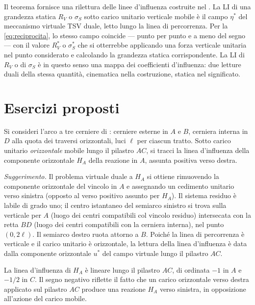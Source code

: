 \begin{oss}
	Il teorema fornisce una rilettura delle linee d'influenza 
	costruite nel . La LI di una 
	grandezza statica $R_V$ o $\sigma_S$ sotto carico unitario 
	verticale mobile è il campo $\eta^{*}$ del meccanismo virtuale 
	TSV duale, letto lungo la linea di percorrenza. Per la 
	\eqref{eq:reciprocita}, lo stesso campo coincide --- punto per 
	punto e a meno del segno --- con il valore $R^{*}_V$ o 
	$\sigma^{*}_S$ che si otterrebbe applicando una forza 
	verticale unitaria nel punto considerato e calcolando la 
	grandezza statica corrispondente. La LI di $R_V$ o di 
	$\sigma_S$ è in questo senso una mappa dei coefficienti 
	d'influenza: due letture duali della stessa quantità, 
	cinematica nella costruzione, statica nel significato.
\end{oss}


\section{Esercizi proposti}




\begin{esercizio}
	\label{ex:LI_HA_arco}
	
	Si consideri l'arco a tre cerniere di
	: cerniere esterne in $A$ e $B$,
	cerniera interna in $D$ alla quota dei traversi orizzontali,
	luci $\ell$ per ciascun tratto. Sotto carico unitario
	\emph{orizzontale} mobile lungo il pilastro $AC$, si tracci
	la linea d'influenza della componente orizzontale $H_A$ della
	reazione in $A$, assunta positiva verso destra.
	
	\textit{Suggerimento.} Il problema virtuale duale a $H_A$ si
	ottiene rimuovendo la componente orizzontale del vincolo in
	$A$ e assegnando un cedimento unitario verso sinistra (opposto
	al verso positivo assunto per $H_A$). Il sistema residuo è
	labile di grado uno; il centro istantaneo del semiarco sinistro
	si trova sulla verticale per $A$ (luogo dei centri compatibili
	col vincolo residuo) intersecata con la retta $BD$ (luogo dei
	centri compatibili con la cerniera interna), nel punto
	$(0, 2\ell)$. Il semiarco destro ruota attorno a $B$. Poiché
	la linea di percorrenza è verticale e il carico unitario è
	orizzontale, la lettura della linea d'influenza è data dalla
	componente orizzontale $u^*$ del campo virtuale lungo il
	pilastro $AC$.
	
	\risultato La linea d'influenza di $H_A$ è lineare lungo il
	pilastro $AC$, di ordinata $-1$ in $A$ e $-1/2$ in $C$. Il
	segno negativo riflette il fatto che un carico orizzontale
	verso destra applicato sul pilastro $AC$ produce una reazione
	$H_A$ verso sinistra, in opposizione all'azione del carico
	mobile.
	
\end{esercizio}



